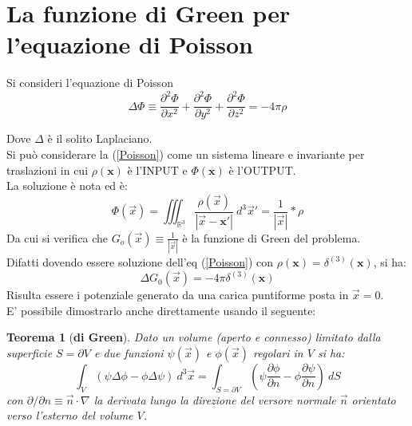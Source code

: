 \documentclass[twoside]{article}
\newtheorem{theorem}{Teorema}[section]
\renewcommand{\vec}[1]{\textbf{#1}}
\begin{document}
\newpage
\section{La funzione di Green per l'equazione di Poisson}
Si consideri l'equazione di Poisson
\begin{equation}\label{Poisson}
    \Delta \Phi \equiv \frac{\partial^2 \Phi}{\partial x^2}+\frac{\partial^2 \Phi}{\partial y^2}+\frac{\partial^2 \Phi}{\partial z^2}=-4\pi \rho
\end{equation}

Dove $\Delta$ è il solito Laplaciano.
\\
Si può considerare la (\ref{Poisson}) come un sistema lineare e invariante per traslazioni in cui $\rho(\vec{x})$ è l'INPUT e $\Phi(\vec{x})$ è l'OUTPUT.
\\
La soluzione è nota ed è:
\begin{equation}\label{23 sol}
    \Phi(\Vec{x})=\iiint_{\mathds{R}^3}\frac{\rho(\Vec{x})}{|\Vec{x}-\vec{x}'|}\ d^3\Vec{x}'=\frac{1}{|\Vec{x}|}*\rho
\end{equation}
Da cui si verifica che $G_o(\Vec{x})\equiv\frac{1}{|\Vec{x}|}$ è la funzione di Green del problema.\\
Difatti dovendo essere soluzione dell'eq (\ref{Poisson}) con $\rho(\vec{x})=\delta^{(3)}(\vec{x})$, si ha:
\begin{equation}
    \Delta G_0(\Vec{x})=-4\pi \delta^{(3)}(\vec{x})
\end{equation}
Risulta essere i potenziale generato da una carica puntiforme posta in $\Vec{x}=0$.\\
E' possibile dimostrarlo anche direttamente usando il seguente:
\begin{theorem}[\textbf{di Green}]\label{green}
Dato un volume (aperto e connesso) limitato dalla superficie $S=\partial V$ e due funzioni $\psi(\Vec{x})$ e $\phi(\Vec{x})$ regolari in $V$ si ha:
\begin{equation}
    \int_V(\psi \Delta \phi - \phi \Delta \psi) \ d^3 \Vec{x}=\int_{S=\partial V}\left( \psi \frac{\partial \phi}{\partial n}-\phi \frac{\partial \psi}{\partial n} \right) \ dS
\end{equation}
con $\partial/ \partial n \equiv \Vec{n}\cdot \nabla $ la derivata lungo la direzione del versore normale $\Vec{n}$ orientato verso l'esterno del volume $V$.
\end{theorem}
\end{document}
